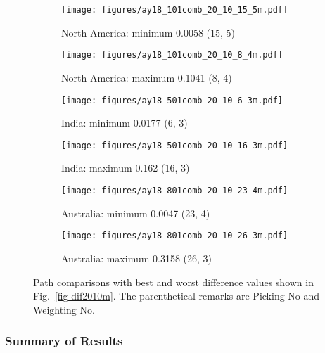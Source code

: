\begin{figure*}
	\centering
	\begin{subfigure}{.43\textwidth}
		\texttt{[image: figures/ay18\_101comb\_20\_10\_15\_5m.pdf]}
		\caption{North America: minimum 0.0058 (15, 5)}\label{fig-nac-2010155m}
	\end{subfigure}
	\begin{subfigure}{.43\textwidth}
		\texttt{[image: figures/ay18\_101comb\_20\_10\_8\_4m.pdf]}
		\caption{North America: maximum 0.1041 (8, 4)}\label{fig-nac-201084m}
	\end{subfigure}
	\vspace{.1em}
	\begin{subfigure}{.43\textwidth}
		\texttt{[image: figures/ay18\_501comb\_20\_10\_6\_3m.pdf]}
		\caption{India: minimum 0.0177 (6, 3)}\label{fig-ind-201063m}
	\end{subfigure}
	\begin{subfigure}{.43\textwidth}
		\texttt{[image: figures/ay18\_501comb\_20\_10\_16\_3m.pdf]}
		\caption{India: maximum 0.162 (16, 3)}\label{fig-ind-2010163m}
	\end{subfigure}
	\vspace{.1em}
	\begin{subfigure}{.43\textwidth}
		\texttt{[image: figures/ay18\_801comb\_20\_10\_23\_4m.pdf]}
		\caption{Australia: minimum 0.0047 (23, 4)}\label{fig-au-2010234m}
	\end{subfigure}
	\begin{subfigure}{.43\textwidth}
		\texttt{[image: figures/ay18\_801comb\_20\_10\_26\_3m.pdf]}
		\caption{Australia: maximum 0.3158 (26, 3)}\label{fig-au-2010263m}
	\end{subfigure}
	\caption[Best and worst differences (20 Myr bin, 10 Myr
step)]{Path comparisons with best and worst difference values shown in
Fig.~\ref{fig-dif2010m}. The parenthetical remarks are Picking No and Weighting No.}\label{fig-dif2010bwm}
\end{figure*}


\subsubsection{Summary of Results}

